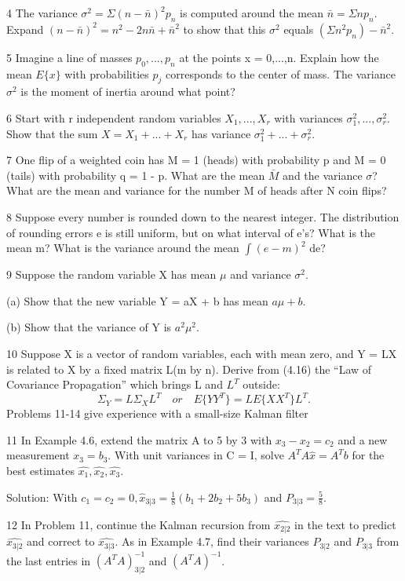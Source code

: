 4\; The variance $\sigma^2=\Sigma(n-\bar{n})^2p_n$  is computed around the mean $\bar{n}=\Sigma np_n$. Expand $(n-\bar{n})^2=n^2-2n\bar{n}+\bar{n}^2$ to show that this $\sigma^2$ equals $(\Sigma n^2p_n)-\bar{n}^2$.

5\; Imagine a line of masses $p_0,...,p_n$ at the points x = 0,...,n. Explain how the
mean $E\{x\}$ with probabilities $p_j$ corresponds to the center of mass. The variance $\sigma^2$
is the moment of inertia around what point?

6\; Start with r independent random variables $X_1,...,X_r$ with variances $\sigma^2_1,...,\sigma^2_r$. Show that the sum $X=X_1+...+X_r$ has variance $\sigma^2_1+...+\sigma^2_r$.

7\; One flip of a weighted coin has M = 1 (heads) with probability p and M = 0 (tails)
with probability q = 1 - p. What are the mean $\bar{M}$ and the variance $\sigma$? What are
the mean and variance for the number M of heads after N coin flips?

8\; Suppose every number is rounded down to the nearest integer. The distribution of
rounding errors e is still uniform, but on what interval of e's? What is the mean m?
What is the variance around the mean $\int(e-m)^2$ de?

9\; Suppose the random variable X has mean $\mu$ and variance $\sigma^2$.

(a) \; Show that the new variable Y = aX + b has mean $a\mu+b$.

(b) \; Show that the variance of Y is $a^2\mu^2$.

10\; Suppose X is a vector of random variables, each with mean zero, and Y = LX is
related to X by a fixed matrix L(m by n). Derive from (4.16) the “Law of Covariance
Propagation” which brings L and $L^T$ outside:
\begin{equation*}
\Sigma_Y=L\Sigma_XL^T \quad or \quad E\{YY^T\}=LE\{XX^T\}L^T.
\end{equation*}
Problems 11-14 give experience with a small-size Kalman filter

11\; In Example 4.6, extend the matrix A to 5 by 3 with $x_3-x_2=c_2$ and a new measurement
$x_3=b_3$. With unit variances in C = I, solve $A^TA\hat{x}=A^Tb$ for the best estimates $\hat{x_1},\hat{x_2},\hat{x_3}$.

Solution: With $c_1=c_2=0,\hat{x}_{3|3}=\frac{1}{8}(b_1+2b_2+5b_3)$ and $P_{3|3}=\frac{5}{8}$.

12\; In Problem 11, continue the Kalman recursion from $\hat{x_{2|2}}$ in the text to predict 
$\hat{x_{3|2}}$ and correct to $\hat{x_{3|3}}$. As in Example 4.7, find their variances $P_{3|2}$ and $P_{3|3}$ from the last entries in $(A^TA)^{-1}_{3|2}$ and $(A^TA)^{-1}$.

